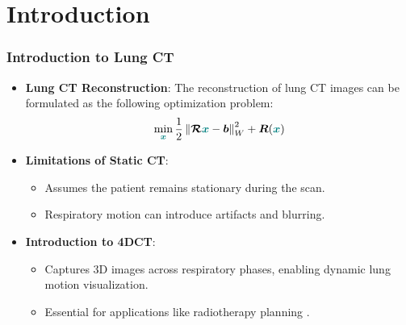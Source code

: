 
\section{Introduction}


\begin{frame}[t, fragile]
  \frametitle{Introduction to Lung CT}

  \begin{itemize}
    \item<1-> \textbf{Lung CT Reconstruction}: The reconstruction of lung CT images can be formulated as the following optimization problem:
          \begin{equation*}
            \min_{\textcolor{green}{\boldx}} \frac{1}{2}\left\| \boldcalR \textcolor{green}{\boldx} - \boldb \right\|_{W}^2 + \boldR(\textcolor{green}{\boldx})
          \end{equation*}
    \item<2-> \textbf{Limitations of Static CT}:
          \begin{itemize}
            \item Assumes the patient remains stationary during the scan.
            \item Respiratory motion can introduce artifacts and blurring.
          \end{itemize}
    \item<3-> \textbf{Introduction to 4DCT}:
          \begin{itemize}
            \item Captures 3D images across respiratory phases, enabling dynamic lung motion visualization.
            \item Essential for applications like radiotherapy planning \cite{kwong2015f}.
          \end{itemize}
  \end{itemize}
\end{frame}

